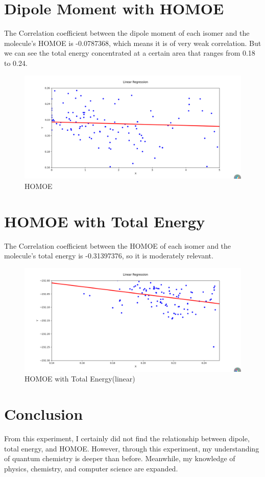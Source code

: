 \documentclass{article}
\begin{document}
\section{Dipole Moment with HOMOE}
The Correlation coefficient between the dipole moment of each isomer and the molecule's HOMOE is -0.0787368, which means it is of very weak correlation. But we can see the total energy concentrated at a certain area that ranges from 0.18 to 0.24.
\begin{figure}[H]
\centering
\includegraphics[scale=0.35]{HOMOE fit.png}
\caption{HOMOE}
\label{fig:HOMOE}
\end{figure}


\section{HOMOE with Total Energy}
The Correlation coefficient between the HOMOE of each isomer and the \\molecule's total energy is -0.31397376, so it is moderately relevant.
\begin{figure}[H]
\centering
\includegraphics[scale=0.35]{fit.png}
\caption{HOMOE with Total Energy(linear)}
\label{fig:HOMOE with Total Energy}
\end{figure}


\section{Conclusion}
From this experiment, I certainly did not find the relationship between dipole, total energy, and HOMOE. However, through this experiment, my understanding of quantum chemistry is deeper than before. Meanwhile, my knowledge of physics, chemistry, and computer science are expanded.



\end{document}
